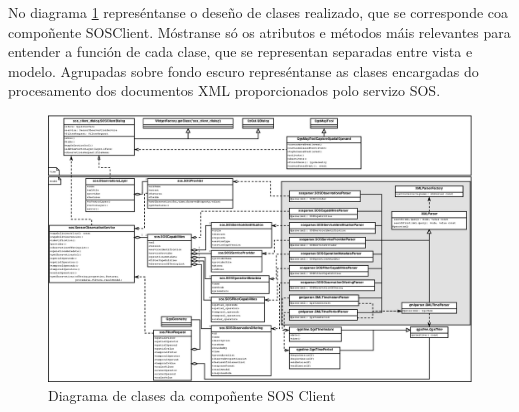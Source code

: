 No diagrama \ref{fig:diaClassSOSClient} represéntanse o deseño de clases realizado, que se corresponde coa compoñente SOSClient. Móstranse só os atributos e métodos máis relevantes para entender a función de cada clase, que se representan separadas entre vista e modelo. Agrupadas sobre fondo escuro represéntanse as clases encargadas do procesamento dos documentos XML proporcionados polo servizo SOS.

\begin{figure}
 \centering
 \includegraphics[width=\textwidth]{images/clases_sos_client.eps}
 \caption{Diagrama de clases da compoñente SOS Client}
 \label{fig:diaClassSOSClient}
\end{figure}

